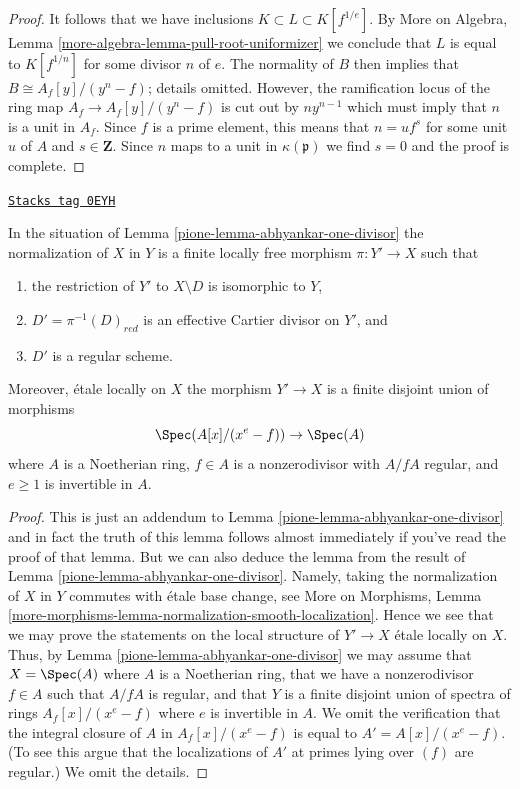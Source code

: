 \begin{proof}
\medskip\noindent
It follows that we have inclusions $K \subset L \subset K[f^{1/e}]$.
By More on Algebra, Lemma \ref{more-algebra-lemma-pull-root-uniformizer}
we conclude that $L$ is equal to $K[f^{1/n}]$ for some divisor $n$ of $e$.
The normality of $B$ then implies that $B \cong A_f[y]/(y^n - f)$; details
omitted.
However, the ramification locus of the ring map $A_f \to A_f[y]/(y^n - f)$
is cut out by $ny^{n - 1}$ which must imply that $n$ is a unit in $A_f$.
Since $f$ is a prime element, this means that $n = u f^s$ for
some unit $u$ of $A$ and $s \in \mathbf{Z}$. Since $n$ maps to a unit in
$\kappa(\mathfrak p)$ we find $s = 0$ and the proof is complete.
\end{proof}

\begin{lemma}
\label{pione-lemma-extend-tame-covering-normal}
\href{https://stacks.math.columbia.edu/tag/0EYH}{\texttt{Stacks tag 0EYH}}

In the situation of Lemma \ref{pione-lemma-abhyankar-one-divisor}
the normalization of $X$ in $Y$ is a finite locally free morphism
$\pi : Y' \to X$ such that
\begin{enumerate}
\item the restriction of $Y'$ to $X \setminus D$ is isomorphic to $Y$,
\item $D' = \pi^{-1}(D)_{red}$ is an effective Cartier divisor on $Y'$, and
\item $D'$ is a regular scheme.
\end{enumerate}
Moreover, \'etale locally on $X$ the morphism $Y' \to X$ is a finite disjoint
union of morphisms
$$
\Spec(A[x]/(x^e - f)) \to \Spec(A)
$$
where $A$ is a Noetherian ring, $f \in A$ is a nonzerodivisor with
$A/fA$ regular, and $e \geq 1$ is invertible in $A$.
\end{lemma}

\begin{proof}

This is just an addendum to Lemma \ref{pione-lemma-abhyankar-one-divisor}
and in fact the truth of this lemma follows almost immediately if
you've read the proof of that lemma. But we can also deduce
the lemma from the result of Lemma \ref{pione-lemma-abhyankar-one-divisor}.
Namely, taking the normalization of $X$ in $Y$ commutes with
\'etale base change, see More on Morphisms, Lemma
\ref{more-morphisms-lemma-normalization-smooth-localization}.
Hence we see that we may prove the statements on the local structure
of $Y' \to X$ \'etale locally on $X$. Thus, by
Lemma \ref{pione-lemma-abhyankar-one-divisor} we may assume that
$X = \Spec(A)$ where $A$ is a Noetherian ring, that we have a
nonzerodivisor $f\in A$ such that $A/fA$ is regular, and that $Y$
is a finite disjoint union of spectra of rings $A_f[x]/(x^e - f)$
where $e$ is invertible in $A$. We omit the verification that
the integral closure of $A$ in $A_f[x]/(x^e - f)$ is
equal to $A' = A[x]/(x^e - f)$. (To see this argue that
the localizations of $A'$ at primes lying over $(f)$ are regular.)
We omit the details.
\end{proof}

